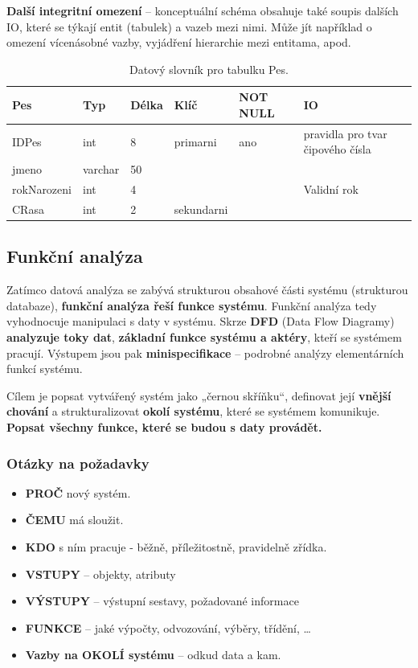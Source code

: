 \textbf{Další integritní omezení} -- konceptuální schéma obsahuje také soupis dalších IO, které se týkají entit (tabulek) a vazeb mezi nimi. Může jít například o omezení vícenásobné vazby, vyjádření hierarchie mezi entitama, apod. 

\begin{table}[H]
	\centering
	\begin{tabular}{|l|l|l|l|l|l|}
		\hline
		\textbf{Pes} & \textbf{Typ} & \textbf{Délka} & \textbf{Klíč} & \textbf{NOT NULL} & \textbf{IO}                      \\ \hline
		IDPes        & int          & 8              & primarni      & ano               & pravidla pro tvar čipového čísla \\ \hline
		jmeno        & varchar      & 50             &               &                   &                                  \\ \hline
		rokNarozeni & int          & 4              &               &                   & Validní rok                      \\ \hline
		CRasa        & int          & 2              & sekundarni    &                   &                                  \\ \hline
	\end{tabular}
\caption{Datový slovník pro tabulku Pes.}
\end{table}

\subsection{Funkční analýza}
Zatímco datová analýza se zabývá strukturou obsahové části systému (strukturou databaze), \textbf{funkční analýza řeší funkce systému}. Funkční analýza tedy vyhodnocuje manipulaci s daty v systému. Skrze \textbf{DFD} (Data Flow Diagramy) \textbf{analyzuje toky dat}, \textbf{základní funkce systému a aktéry}, kteří se systémem pracují. Výstupem jsou pak \textbf{minispecifikace} -- podrobné analýzy elementárních funkcí systému. 

Cílem je popsat vytvářený systém jako „černou skříňku“, definovat její \textbf{vnější chování} a strukturalizovat \textbf{okolí systému}, které se systémem komunikuje. \textbf{Popsat všechny funkce, které se budou s daty provádět.}

\subsubsection*{Otázky na požadavky}
\begin{itemize}
\item\textbf{PROČ} nový systém. 
\item\textbf{ČEMU} má sloužit. 
\item\textbf{KDO} s ním pracuje - běžně, příležitostně, pravidelně zřídka. 
\item\textbf{VSTUPY} – objekty, atributy 
\item\textbf{VÝSTUPY} – výstupní sestavy, požadované informace 
\item\textbf{FUNKCE} – jaké výpočty, odvozování, výběry, třídění, \ldots
\item\textbf{Vazby na OKOLÍ systému} – odkud data a kam.
\end{itemize}

